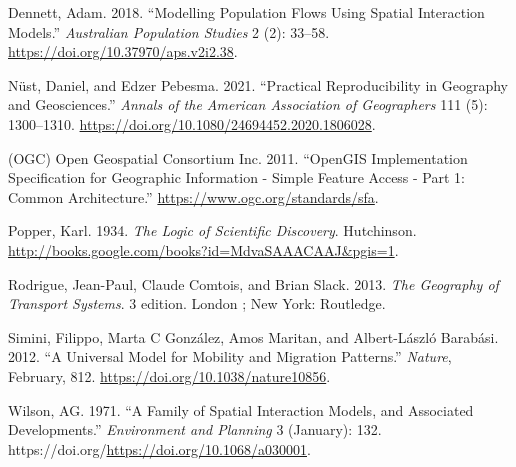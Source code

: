 \documentclass[11pt,letterpaper]{article}
\newlength{\cslhangindent}
\newlength{\cslentryspacingunit} %
\newenvironment{CSLReferences}[2] %
 {%
  \setlength{\parindent}{0pt}
  \ifodd #1
  \let\oldpar\par
  \def\par{\hangindent=\cslhangindent\oldpar}
  \fi
  \setlength{\parskip}{#2\cslentryspacingunit}
 }%
 {}
\begin{document}
\hypertarget{refs}{}
\begin{CSLReferences}{1}{0}
\leavevmode{}%
Dennett, Adam. 2018. {``Modelling Population Flows Using Spatial Interaction Models.''} \emph{Australian Population Studies} 2 (2): 33--58. \url{https://doi.org/10.37970/aps.v2i2.38}.

\leavevmode{}%
Nüst, Daniel, and Edzer Pebesma. 2021. {``Practical Reproducibility in Geography and Geosciences.''} \emph{Annals of the American Association of Geographers} 111 (5): 1300--1310. \url{https://doi.org/10.1080/24694452.2020.1806028}.

\leavevmode{}%
(OGC) Open Geospatial Consortium Inc. 2011. {``OpenGIS Implementation Specification for Geographic Information - Simple Feature Access - Part 1: Common Architecture.''} \url{https://www.ogc.org/standards/sfa}.

\leavevmode{}%
Popper, Karl. 1934. \emph{The Logic of Scientific Discovery}. Hutchinson. \url{http://books.google.com/books?id=MdvaSAAACAAJ\&pgis=1}.

\leavevmode{}%
Rodrigue, Jean-Paul, Claude Comtois, and Brian Slack. 2013. \emph{The Geography of Transport Systems}. 3 edition. London ; New York: Routledge.

\leavevmode{}%
Simini, Filippo, Marta C González, Amos Maritan, and Albert-László Barabási. 2012. {``A Universal Model for Mobility and Migration Patterns.''} \emph{Nature}, February, 812. \url{https://doi.org/10.1038/nature10856}.

\leavevmode{}%
Wilson, AG. 1971. {``A Family of Spatial Interaction Models, and Associated Developments.''} \emph{Environment and Planning} 3 (January): 132. https://doi.org/\url{https://doi.org/10.1068/a030001}.

\end{CSLReferences}




\setlength{\bibsep}{0.00cm plus 0.05cm} %


\end{document}
